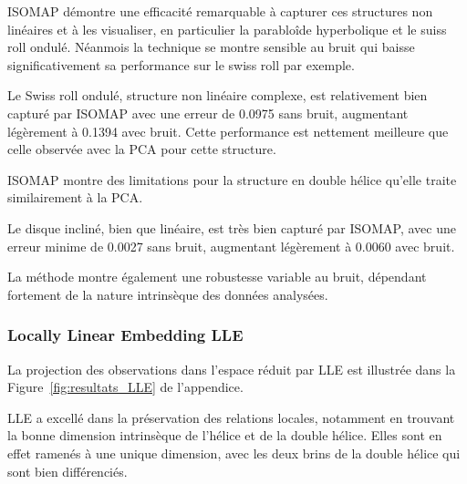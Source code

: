 \documentclass[unnumsec,webpdf,modern,large]{projet_manifold}%
\theoremstyle{thmstyleone}%
\theoremstyle{thmstyletwo}%
\theoremstyle{thmstylethree}%
\begin{document}
\begin{table}[htbp]
\centering
\caption{Erreurs de reconstruction ISOMAP (basées sur les distances géodésiques globales)}
\label{tab:isomap_errors}
\end{table}

ISOMAP démontre une efficacité remarquable à capturer ces structures non linéaires et à les visualiser, en particulier la parabloîde hyperbolique et le suiss roll ondulé. Néanmois la technique se montre sensible au bruit qui baisse significativement sa performance sur le swiss roll par exemple.

Le Swiss roll ondulé, structure non linéaire complexe, est relativement bien capturé par ISOMAP avec une erreur de 0.0975 sans bruit, augmentant légèrement à 0.1394 avec bruit. Cette performance est nettement meilleure que celle observée avec la PCA pour cette structure.

ISOMAP montre des limitations pour la structure en double hélice qu'elle traite similairement à la PCA.

Le disque incliné, bien que linéaire, est très bien capturé par ISOMAP, avec une erreur minime de 0.0027 sans bruit, augmentant légèrement à 0.0060 avec bruit.

La méthode montre également une robustesse variable au bruit, dépendant fortement de la nature intrinsèque des données analysées.


\subsubsection{Locally Linear Embedding LLE}
La projection des observations dans l'espace réduit par LLE est illustrée dans la Figure~\ref{fig:resultats_LLE} de l'appendice.

LLE a excellé dans la préservation des relations locales, notamment en trouvant la bonne dimension intrinsèque de l'hélice et de la double hélice. Elles sont en effet ramenés à une unique dimension, avec les deux brins de la double hélice qui sont bien différenciés.
\end{document}
